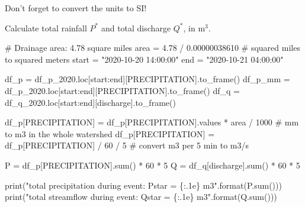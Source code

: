 \documentclass[
  letterpaper,
  DIV=11,
  numbers=noendperiod]{scrreprt}
\newenvironment{Shaded}{\begin{snugshade}}{\end{snugshade}}
\newcommand{\BuiltInTok}[1]{\textcolor[rgb]{0.00,0.23,0.31}{#1}}
\newcommand{\CommentTok}[1]{\textcolor[rgb]{0.37,0.37,0.37}{#1}}
\newcommand{\DecValTok}[1]{\textcolor[rgb]{0.68,0.00,0.00}{#1}}
\newcommand{\FloatTok}[1]{\textcolor[rgb]{0.68,0.00,0.00}{#1}}
\newcommand{\NormalTok}[1]{\textcolor[rgb]{0.00,0.23,0.31}{#1}}
\newcommand{\OperatorTok}[1]{\textcolor[rgb]{0.37,0.37,0.37}{#1}}
\newcommand{\SpecialCharTok}[1]{\textcolor[rgb]{0.37,0.37,0.37}{#1}}
\newcommand{\StringTok}[1]{\textcolor[rgb]{0.13,0.47,0.30}{#1}}
\begin{document}
Don't forget to convert the units to SI!

Calculate total rainfall \(P^*\) and total discharge \(Q^*\), in
m\(^3\).

\begin{Shaded}
\begin{Highlighting}[]
\CommentTok{\# Drainage area: 4.78 square miles}
\NormalTok{area }\OperatorTok{=} \FloatTok{4.78} \OperatorTok{/} \FloatTok{0.00000038610}  \CommentTok{\# squared miles to squared meters}
\NormalTok{start }\OperatorTok{=} \StringTok{"2020{-}10{-}20 14:00:00"}
\NormalTok{end }\OperatorTok{=} \StringTok{"2020{-}10{-}21 04:00:00"}

\NormalTok{df\_p }\OperatorTok{=}\NormalTok{ df\_p\_2020.loc[start:end][}\StringTok{\textquotesingle{}PRECIPITATION\textquotesingle{}}\NormalTok{].to\_frame()}
\NormalTok{df\_p\_mm }\OperatorTok{=}\NormalTok{ df\_p\_2020.loc[start:end][}\StringTok{\textquotesingle{}PRECIPITATION\textquotesingle{}}\NormalTok{].to\_frame()}
\NormalTok{df\_q }\OperatorTok{=}\NormalTok{ df\_q\_2020.loc[start:end][}\StringTok{\textquotesingle{}discharge\textquotesingle{}}\NormalTok{].to\_frame()}

\NormalTok{df\_p[}\StringTok{\textquotesingle{}PRECIPITATION\textquotesingle{}}\NormalTok{] }\OperatorTok{=}\NormalTok{ df\_p[}\StringTok{\textquotesingle{}PRECIPITATION\textquotesingle{}}\NormalTok{].values }\OperatorTok{*}\NormalTok{ area }\OperatorTok{/} \DecValTok{1000}  \CommentTok{\# mm to m3 in the whole watershed}
\NormalTok{df\_p[}\StringTok{\textquotesingle{}PRECIPITATION\textquotesingle{}}\NormalTok{] }\OperatorTok{=}\NormalTok{ df\_p[}\StringTok{\textquotesingle{}PRECIPITATION\textquotesingle{}}\NormalTok{] }\OperatorTok{/} \DecValTok{60} \OperatorTok{/} \DecValTok{5} \CommentTok{\# convert m3 per 5 min to m3/s}

\NormalTok{P }\OperatorTok{=}\NormalTok{ df\_p[}\StringTok{\textquotesingle{}PRECIPITATION\textquotesingle{}}\NormalTok{].}\BuiltInTok{sum}\NormalTok{() }\OperatorTok{*} \DecValTok{60} \OperatorTok{*} \DecValTok{5}
\NormalTok{Q }\OperatorTok{=}\NormalTok{ df\_q[}\StringTok{\textquotesingle{}discharge\textquotesingle{}}\NormalTok{].}\BuiltInTok{sum}\NormalTok{() }\OperatorTok{*} \DecValTok{60} \OperatorTok{*} \DecValTok{5}

\BuiltInTok{print}\NormalTok{(}\StringTok{"total precipitation during event: Pstar = }\SpecialCharTok{\{:.1e\}}\StringTok{ m3"}\NormalTok{.}\BuiltInTok{format}\NormalTok{(P.}\BuiltInTok{sum}\NormalTok{()))}
\BuiltInTok{print}\NormalTok{(}\StringTok{"total streamflow during event: Qstar = }\SpecialCharTok{\{:.1e\}}\StringTok{ m3"}\NormalTok{.}\BuiltInTok{format}\NormalTok{(Q.}\BuiltInTok{sum}\NormalTok{()))}
\end{Highlighting}
\end{Shaded}
\end{document}
